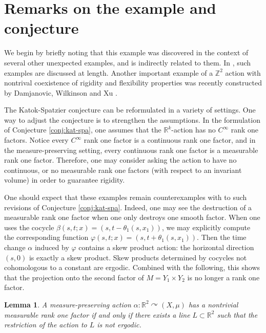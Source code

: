 \documentclass[12pt]{amsart}
\newtheorem{lemma}[theorem]{Lemma}
\theoremstyle{definition}
\theoremstyle{remark}
\numberwithin{equation}{section}
\newcommand{\Z}{\mathbb{Z}}
\newcommand{\R}{\mathbb{R}}
\newtheorem{Structural Stability Theorem}[theorem]{Structural Stability Theorem}
\begin{document}
\section{Remarks on the example and conjecture}
\label{sec:updates}

We begin by briefly noting that this example was discovered in the context of several other unexpected examples, and is indirectly related to them. In \cite{spatzier-vinhage}, such examples are discussed at length. Another important example of a $\Z^2$ action with nontrival coexistence of rigidity and flexibility properties was recently constructed by Damjanovic, Wilkinson and Xu \cite{DWX}.

The Katok-Spatzier conjecture can be reformulated in a variety of settings. One way to adjust the conjecture is to strengthen the assumptions. In the formulation of Conjecture \ref{conj:kat-spa}, one assumes that the $\R^k$-action has no $C^\infty$ rank one factors. Notice every $C^\infty$ rank one factor is a continuous rank one factor, and in the measure-preserving setting, every continuous rank one factor is a measurable rank one factor. Therefore, one may consider asking the action to have no continuous, or no measurable rank one factors (with respect to an invariant volume) in order to guarantee rigidity.

One should expect that these examples remain counterexamples with to such revisions of Conjecture \ref{conj:kat-spa}. Indeed, one may see the destruction of a measurable rank one factor when one only destroys one smooth factor. When one uses the cocycle $\beta(s,t;x) = (s,t-\theta_1(s,x_1))$, we may explicitly compute the corresponding function $\varphi(s,t;x) = (s,t+\theta_1(s,x_1))$. Then the time change $\alpha$ induced by $\varphi$ contains a skew product action: the horizontal direction $(s,0)$ is exactly a skew product. Skew products determined by cocycles not cohomologous to a constant are ergodic. Combined with the following, this shows that the projection onto the second factor of $M = Y_1 \times Y_2$ is no longer a rank one factor.

\begin{lemma}
\label{lem:lines-ergodic}
A measure-preserving action $\alpha : \R^2 \curvearrowright (X,\mu)$ has a nontrivial measurable rank one factor if and only if there exists a line $L \subset \R^2$ such that the restriction of the action to $L$ is not ergodic.
\end{lemma}
\end{document}
